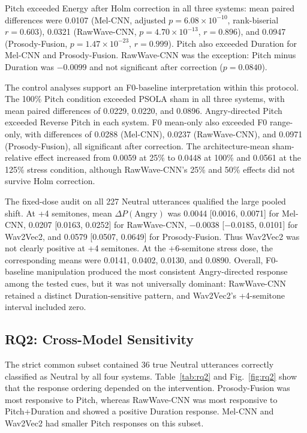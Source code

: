 \documentclass[a4paper,runningheads]{llncs}
\begin{document}
Pitch exceeded Energy after Holm correction in all three systems: mean paired differences were 0.0107 (Mel-CNN, adjusted $p=6.08\times10^{-10}$, rank-biserial $r=0.603$), 0.0321 (RawWave-CNN, $p=4.70\times10^{-13}$, $r=0.896$), and 0.0947 (Prosody-Fusion, $p=1.47\times10^{-23}$, $r=0.999$). Pitch also exceeded Duration for Mel-CNN and Prosody-Fusion. RawWave-CNN was the exception: Pitch minus Duration was $-0.0099$ and not significant after correction ($p=0.0840$).

The control analyses support an F0-baseline interpretation within this protocol. The 100\% Pitch condition exceeded PSOLA sham in all three systems, with mean paired differences of 0.0229, 0.0220, and 0.0896. Angry-directed Pitch exceeded Reverse Pitch in each system. F0 mean-only also exceeded F0 range-only, with differences of 0.0288 (Mel-CNN), 0.0237 (RawWave-CNN), and 0.0971 (Prosody-Fusion), all significant after correction. The architecture-mean sham-relative effect increased from 0.0059 at 25\% to 0.0448 at 100\% and 0.0561 at the 125\% stress condition, although RawWave-CNN's 25\% and 50\% effects did not survive Holm correction.

The fixed-dose audit on all 227 Neutral utterances qualified the large pooled shift. At +4 semitones, mean $\Delta P(\mathrm{Angry})$ was 0.0044 [0.0016, 0.0071] for Mel-CNN, 0.0207 [0.0163, 0.0252] for RawWave-CNN, $-0.0038$ [$-0.0185$, 0.0101] for Wav2Vec2, and 0.0579 [0.0507, 0.0649] for Prosody-Fusion. Thus Wav2Vec2 was not clearly positive at +4 semitones. At the +6-semitone stress dose, the corresponding means were 0.0141, 0.0402, 0.0130, and 0.0890. Overall, F0-baseline manipulation produced the most consistent Angry-directed response among the tested cues, but it was not universally dominant: RawWave-CNN retained a distinct Duration-sensitive pattern, and Wav2Vec2's +4-semitone interval included zero.

\subsection{RQ2: Cross-Model Sensitivity}

The strict common subset contained 36 true Neutral utterances correctly classified as Neutral by all four systems. Table~\ref{tab:rq2} and Fig.~\ref{fig:rq2} show that the response ordering depended on the intervention. Prosody-Fusion was most responsive to Pitch, whereas RawWave-CNN was most responsive to Pitch+Duration and showed a positive Duration response. Mel-CNN and Wav2Vec2 had smaller Pitch responses on this subset.
\end{document}
